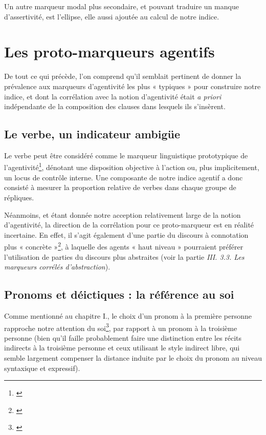 Un autre marqueur modal plus secondaire, et pouvant traduire un manque d’assertivité, est l'ellipse, elle aussi ajoutée au calcul de notre indice.

\chapter{Les proto-marqueurs agentifs}

De tout ce qui précède, l’on comprend qu’il semblait pertinent de donner la prévalence aux marqueurs d’agentivité les plus « typiques » pour construire notre indice, et dont la corrélation avec la notion d'agentivité était \textit{a priori} indépendante de la composition des clauses dans lesquels ils s’insèrent.

\section{Le verbe, un indicateur ambigüe}

Le verbe peut être considéré comme le marqueur linguistique prototypique de l'agentivité\footnote{\cite{formanowicz_verbs_2017}}, dénotant une disposition objective à l'action ou, plus implicitement, un locus de contrôle interne. Une composante de notre indice agentif a donc consisté à mesurer la proportion relative de verbes dans chaque groupe de répliques. 

Néanmoins, et étant donnée notre acception relativement large de la notion d’agentivité, la direction de la corrélation pour ce proto-marqueur est en réalité incertaine. En effet, il s’agit également d’une partie du discours à connotation plus « concrète »\footnote{\cite{strik_lievers_linguistic_2021}}, à laquelle des agents « haut niveau » pourraient préférer l’utilisation de parties du discours plus abstraites (voir la partie \textit{III. 3.3. Les marqueurs corrélés d’abstraction}).

\section{Pronoms et déictiques : la référence au soi}

Comme mentionné au chapitre I., le choix d'un pronom à la première personne rapproche notre attention du soi\footnote{\cite{chung_psychological_nodate}}, par rapport à un pronom à la troisième personne (bien qu'il faille probablement faire une distinction entre les récits indirects à la troisième personne et ceux utilisant le style indirect libre, qui semble largement compenser la distance induite par le choix du pronom au niveau syntaxique et expressif). 

